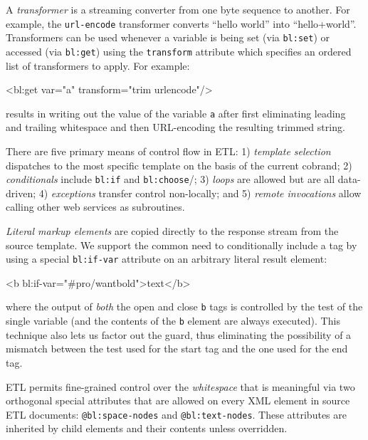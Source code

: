 \documentclass{www2003-submission}
\newcommand{\B}{\discretionary{}{}{}}
\newcommand{\smtexttt}[1]{{\small\texttt{#1}}}
\newcommand{\etl}{ETL}
\newenvironment{smallverbatim}%
{\renewcommand{\baselinestretch}{1}\small\verbatim}%
{\renewcommand{\baselinestretch}{2}\endverbatim}
\begin{document}
A \emph{transformer} is a streaming converter from one byte sequence
to another.  For example, the \smtexttt{url-encode} transformer
converts ``hello world'' into ``hello+world''.  Transformers can be
used whenever a variable is being set (via
\smtexttt{bl:set}) or accessed (via \smtexttt{bl:get}) using the
\smtexttt{transform} attribute which specifies an ordered 
list of transformers to apply.  For example:

\begin{smallverbatim}
<bl:get var="a" transform="trim urlencode"/>
\end{smallverbatim}

\noindent results in writing out the value of the variable \smtexttt{a}
after first eliminating leading and trailing whitespace and then
URL-encoding the resulting trimmed string.

There are five primary means of control flow in \etl{}: 1)
\emph{template selection} dispatches to the most specific template on
the basis of the current cobrand; 2) \emph{conditionals} include
\smtexttt{bl:if} and \smtexttt{bl:choose}/\B{}\smtexttt{bl:when}; 3)
\emph{loops} are allowed but are all data-driven; 4) \emph{exceptions} 
transfer control non-locally; and 5) \emph{remote invocations} allow
calling other web services as subroutines.

\emph{Literal markup elements} are copied directly to the response
stream from the source template.  We support the common need to
conditionally include a tag by using a special
\smtexttt{bl:if-var} attribute on an arbitrary literal result element:

\begin{smallverbatim}
<b bl:if-var="#pro/wantbold">text</b>
\end{smallverbatim}

\noindent where the output of \emph{both} the open and close
\smtexttt{b} tags is controlled by the test of the single variable
(and the contents of the \smtexttt{b} element are always
executed). This technique also lets us factor out the guard, thus
eliminating the possibility of a mismatch between the test used for
the start tag and the one used for the end tag.

\etl{} permits fine-grained control over the \emph{whitespace} that is
meaningful via two orthogonal special attributes that are allowed on
every XML element in source \etl{} documents:
\smtexttt{@bl:space-nodes} and \smtexttt{@bl:text-nodes}.  These
attributes are inherited by child elements and their contents unless
overridden.
\end{document}
